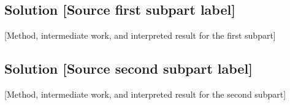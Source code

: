 \subsection*{Solution [Source first subpart label] }
\label{sol:question-multi-first}
[Method, intermediate work, and interpreted result for the first subpart]


\subsection*{Solution [Source second subpart label] }
\label{sol:question-multi-second}
[Method, intermediate work, and interpreted result for the second subpart]


